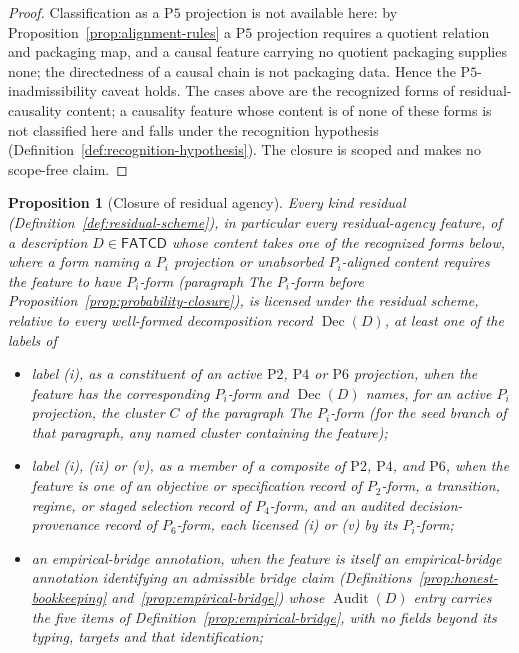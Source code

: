 \documentclass[11pt]{article}
\newtheorem{proposition}[theorem]{Proposition}
\theoremstyle{definition}
\newcommand{\FATCD}{\ensuremath{\mathsf{FATCD}}}
\newcommand{\Audit}[1]{\ensuremath{\operatorname{Audit}\!\left(#1\right)}}
\newcommand{\Dec}[1]{\ensuremath{\operatorname{Dec}\!\left(#1\right)}}
\newcommand{\Ptwo}{\ensuremath{\mathrm{P2}}}
\newcommand{\Pfour}{\ensuremath{\mathrm{P4}}}
\newcommand{\Pfive}{\ensuremath{\mathrm{P5}}}
\newcommand{\Psix}{\ensuremath{\mathrm{P6}}}
\begin{document}
\begin{proof}
Classification as a \Pfive{} projection is not available here: by
Proposition~\ref{prop:alignment-rules} a \Pfive{} projection requires a
quotient relation and packaging map, and a causal feature carrying no
quotient packaging supplies none; the directedness of a causal chain is
not packaging data. Hence the \Pfive{}-inadmissibility caveat holds.
The cases above are the recognized forms of residual-causality content; a
causality feature whose content is of none of these forms is not classified here
and falls under the recognition hypothesis
(Definition~\ref{def:recognition-hypothesis}). The closure is scoped and makes no
scope-free claim.
\end{proof}

\begin{proposition}[Closure of residual agency]\label{prop:agency-closure}
Every kind residual (Definition~\ref{def:residual-scheme}), in particular every residual-agency feature, of a description
\(D \in \FATCD{}\) whose content takes one of the recognized forms below,
where a form naming a \(P_i\) projection or unabsorbed \(P_i\)-aligned content
requires the feature to have \(P_i\)-form (paragraph \emph{The \(P_i\)-form}
before Proposition~\ref{prop:probability-closure}),
is licensed under the residual scheme, relative to every well-formed
decomposition record \(\Dec{D}\), at least one of the labels of
\begin{itemize}[topsep=2pt,itemsep=1pt]
  \item label (i), as a constituent of an active \Ptwo{}, \Pfour{} or \Psix{}
    projection, when the feature has the
    corresponding \(P_i\)-form and \(\Dec{D}\) names, for an active \(P_i\) projection, the cluster \(C\) of the paragraph \emph{The \(P_i\)-form} (for the seed branch of that paragraph, any named cluster containing the feature);
  \item label (i), (ii) or (v), as a member of a composite of \Ptwo{},
    \Pfour{}, and \Psix{}, when the feature is one of an objective or
    specification record of \(P_2\)-form, a
    transition, regime, or staged selection record of \(P_4\)-form, and an
    audited decision-provenance record of \(P_6\)-form, each licensed (i) or (v) by its
    \(P_i\)-form;
  \item an empirical-bridge annotation, when the feature is itself an empirical-bridge annotation identifying an admissible bridge claim (Definitions~\ref{prop:honest-bookkeeping} and~\ref{prop:empirical-bridge}) whose \(\Audit{D}\) entry carries the five items of Definition~\ref{prop:empirical-bridge}, with no fields beyond its typing, targets and that identification;

\end{itemize}
\end{proposition}
\end{document}
